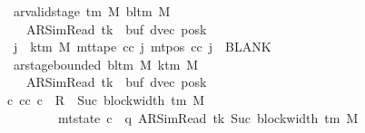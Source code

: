 \begin{isabellebody}
\ \ \ \ \ \ \ \ \ \ \ \ \ \ \ \ \ ar{\isacharunderscore}{\kern0pt}valid{\isacharunderscore}{\kern0pt}stage\ {\isacharparenleft}{\kern0pt}{\isasymGamma}{\isacharunderscore}{\kern0pt}tm\ M{\isacharparenright}{\kern0pt}\ {\isacharparenleft}{\kern0pt}bl{\isacharunderscore}{\kern0pt}tm\ M{\isacharparenright}{\kern0pt}\isanewline
\ \ \ \ \ \ \ \ \ \ \ \ \ \ \ \ \ \ \ {\isacharparenleft}{\kern0pt}AR{\isacharunderscore}{\kern0pt}SimRead{\isacharcomma}{\kern0pt}\ tk{\isacharcomma}{\kern0pt}\ {}{\isacharcomma}{\kern0pt}\ buf{\isacharcomma}{\kern0pt}\ dvec{\isacharcomma}{\kern0pt}\ posk{\isacharparenright}{\kern0pt}{\isacharsemicolon}{\kern0pt}\isanewline
\ \ \ \ \ \ \ \ \ \ \ \ \ \ \ \ \ {\isasymforall}j\ {\isasymge}\ k{\isacharunderscore}{\kern0pt}tm\ M{\isachardot}{\kern0pt}\ mt{\isacharunderscore}{\kern0pt}tape\ cc\ j\ {\isacharparenleft}{\kern0pt}mt{\isacharunderscore}{\kern0pt}pos\ cc\ j{\isacharparenright}{\kern0pt}\ {\isacharequal}{\kern0pt}\ BLANK{}{\isacharsemicolon}{\kern0pt}\isanewline
\ \ \ \ \ \ \ \ \ \ \ \ \ \ \ \ \ ar{\isacharunderscore}{\kern0pt}stage{\isacharunderscore}{\kern0pt}bounded\ {\isacharparenleft}{\kern0pt}bl{\isacharunderscore}{\kern0pt}tm\ M{\isacharparenright}{\kern0pt}\ {\isacharparenleft}{\kern0pt}k{\isacharunderscore}{\kern0pt}tm\ M{\isacharparenright}{\kern0pt}\isanewline
\ \ \ \ \ \ \ \ \ \ \ \ \ \ \ \ \ \ \ {\isacharparenleft}{\kern0pt}AR{\isacharunderscore}{\kern0pt}SimRead{\isacharcomma}{\kern0pt}\ tk{\isacharcomma}{\kern0pt}\ {}{\isacharcomma}{\kern0pt}\ buf{\isacharcomma}{\kern0pt}\ dvec{\isacharcomma}{\kern0pt}\ posk{\isacharparenright}{\kern0pt}\ {\isasymrbrakk}\isanewline
\ \ \ \ \ \ \ \ \ \ \ \ \ \ \ {\isasymLongrightarrow}\ {\isasymexists}c{\isacharprime}{\kern0pt}{\isacharprime}{\kern0pt}{\isachardot}{\kern0pt}\ {\isacharparenleft}{\kern0pt}cc{\isacharcomma}{\kern0pt}\ c{\isacharprime}{\kern0pt}{\isacharprime}{\kern0pt}{\isacharparenright}{\kern0pt}\ {\isasymin}\ R{\isacharprime}{\kern0pt}\ {\isacharcircum}{\kern0pt}{\isacharcircum}{\kern0pt}\ Suc\ {\isacharparenleft}{\kern0pt}block{\isacharunderscore}{\kern0pt}width\ {\isacharparenleft}{\kern0pt}{\isasymGamma}{\isacharunderscore}{\kern0pt}tm\ M{\isacharparenright}{\kern0pt}{\isacharparenright}{\kern0pt}\isanewline
\ \ \ \ \ \ \ \ \ \ \ \ \ \ \ \ \ \ \ \ \ \ \ {\isasymand}\ mt{\isacharunderscore}{\kern0pt}state\ c{\isacharprime}{\kern0pt}{\isacharprime}{\kern0pt}\ {\isacharequal}{\kern0pt}\ {\isacharparenleft}{\kern0pt}q{\isacharcomma}{\kern0pt}\ AR{\isacharunderscore}{\kern0pt}SimRead{\isacharcomma}{\kern0pt}\ tk{\isacharcomma}{\kern0pt}\ Suc\ {\isacharparenleft}{\kern0pt}block{\isacharunderscore}{\kern0pt}width\ {\isacharparenleft}{\kern0pt}{\isasymGamma}{\isacharunderscore}{\kern0pt}tm\ M{\isacharparenright}{\kern0pt}{\isacharparenright}{\kern0pt}{\isacharcomma}{\kern0pt}\isanewline

\end{isabellebody}

